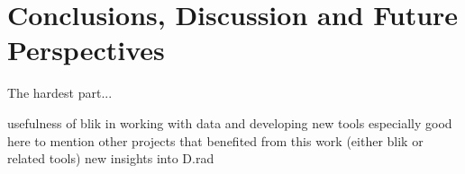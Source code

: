 \chapter{Conclusions, Discussion and Future Perspectives}

The hardest part...

\begin{outline}
\1 usefulness of blik in working with data and developing new tools
    \2 especially good here to mention other projects that benefited from this work (either blik or related tools)
\1 new insights into D.rad

\end{outline}
